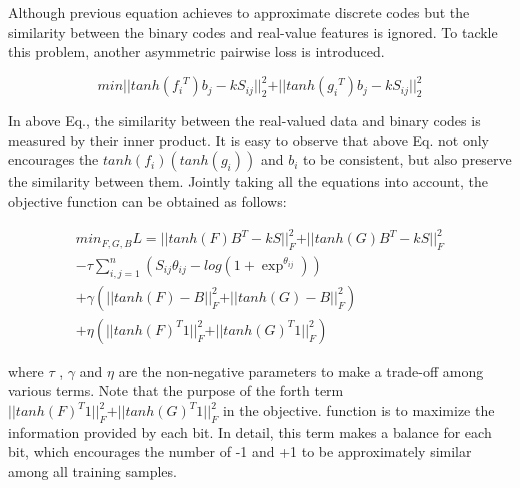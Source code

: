\documentclass[12pt, a4paper,twoside]{article}
\begin{document}
Although previous equation achieves to approximate discrete codes but the similarity between the binary codes and real-value features is ignored. To tackle this problem, another asymmetric pairwise loss is introduced.

\begin{equation}
	    min \vert \vert tanh({f_{i}}^T)b_{j} - kS_{ij} \vert \vert ^2 _{2} + \vert \vert tanh({g_{i}}^T)b_{j} - kS_{ij} \vert \vert^2_{2}
\label{eq11}
\end{equation}

In above Eq., the similarity between the real-valued data and binary codes is measured by their inner product. It is easy to observe that above Eq. not only encourages the $tanh(f_{i} ) (tanh(g_{i} ))$ and $b_{i}$ to be consistent, but also preserve the similarity between them.
Jointly taking all the equations into account, the objective function can be obtained as follows:


\begin{equation}
	\begin{aligned}
	    min_{F,G,B}  L = \vert \vert tanh(F)B^T - kS \vert \vert ^2 _{F} + \vert \vert tanh(G)B^T - kS \vert \vert^2_{F} 
	    \\- \tau \sum\limits_{i,j=1}^n (S_{ij}\theta_{ij} - log(1 + \exp^{\theta_{ij}})) 
	    \\+ \gamma (\vert \vert tanh(F) - B \vert \vert^2_{F} + \vert \vert tanh(G) - B\vert \vert^2_{F}) 
	    \\+ \eta(\vert \vert tanh(F)^T1\vert\vert^2_{F} + \vert\vert tanh(G)^T1 \vert \vert^2_{F})
	   \end{aligned}
\label{eq12}
\end{equation}


where $\tau$ , $\gamma$ and $\eta$ are the non-negative parameters to make a trade-off among various terms. Note that the purpose of the
forth term $\vert \vert tanh(F)^T1 \vert \vert^2_{F} + \vert \vert tanh(G)^T1 \vert \vert^2_{F}$ in the objective. function is to maximize the information provided by each bit. In detail, this term makes a balance for each bit, which encourages the number of -1 and +1 to be approximately similar among all training samples.
\end{document}
